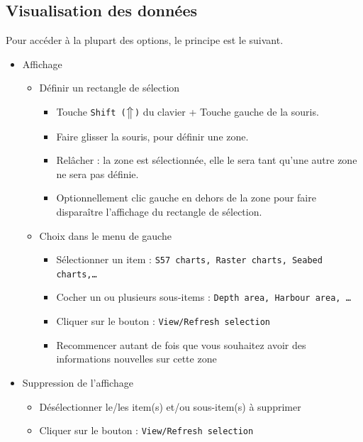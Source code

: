 \subsection{Visualisation des données}
Pour accéder à la plupart des options, le principe est le suivant. 
\begin{itemize}
\item {Affichage}
\begin{itemize}
\item Définir un rectangle de sélection	
	\begin{itemize}
	\item Touche {\tt Shift ($\big\Uparrow$)} du clavier + Touche gauche de la souris.
	\item Faire glisser la souris, pour définir une zone.
	\item Relâcher : la zone est sélectionnée, elle le sera tant qu'une autre zone ne sera pas définie.
	\item Optionnellement clic gauche en dehors de la zone pour faire disparaître l'affichage du rectangle de sélection.
	\end{itemize}
\item Choix dans le menu de gauche
    \begin{itemize}
	\item Sélectionner un item : {\tt S57 charts, Raster charts, Seabed charts,\ldots}
	\item Cocher un ou plusieurs sous-items : {\tt Depth area, Harbour area, \ldots}
	\item Cliquer sur le bouton : {\tt View/Refresh selection}
	\item Recommencer autant de fois que vous souhaitez avoir des informations nouvelles sur cette zone
	\end{itemize}
	\end{itemize}
	\item Suppression de l'affichage
    \begin{itemize}
	\item Désélectionner le/les item(s)  et/ou sous-item(s) à supprimer
	\item Cliquer sur le bouton : {\tt View/Refresh selection}
	\end{itemize}
\end{itemize}
